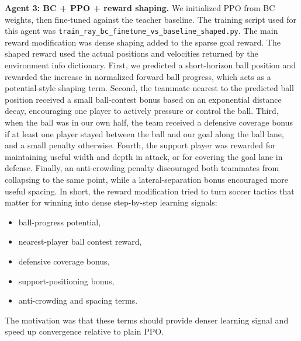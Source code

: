 \documentclass{article}
\begin{document}
\textbf{Agent 3: BC + PPO + reward shaping.}
We initialized PPO from BC weights, then fine-tuned against the teacher baseline.
The training script used for this agent was
\texttt{train\_ray\_bc\_finetune\_vs\_baseline\_shaped.py}.
The main reward modification was dense shaping added to the sparse goal reward.
The shaped reward used the actual positions and velocities returned by the
environment info dictionary.
First, we predicted a short-horizon ball position and rewarded the increase in
normalized forward ball progress, which acts as a potential-style shaping term.
Second, the teammate nearest to the predicted ball position received a small
ball-contest bonus based on an exponential distance decay, encouraging one player
to actively pressure or control the ball.
Third, when the ball was in our own half, the team received a defensive coverage
bonus if at least one player stayed between the ball and our goal along the ball
lane, and a small penalty otherwise.
Fourth, the support player was rewarded for maintaining useful width and depth in
attack, or for covering the goal lane in defense.
Finally, an anti-crowding penalty discouraged both teammates from collapsing to
the same point, while a lateral-separation bonus encouraged more useful spacing.
In short, the reward modification tried to turn soccer tactics that matter for
winning into dense step-by-step learning signals:
\begin{itemize}
\item ball-progress potential,
\item nearest-player ball contest reward,
\item defensive coverage bonus,
\item support-positioning bonus,
\item anti-crowding and spacing terms.
\end{itemize}
The motivation was that these terms should provide denser learning signal and
speed up convergence relative to plain PPO.
\end{document}
